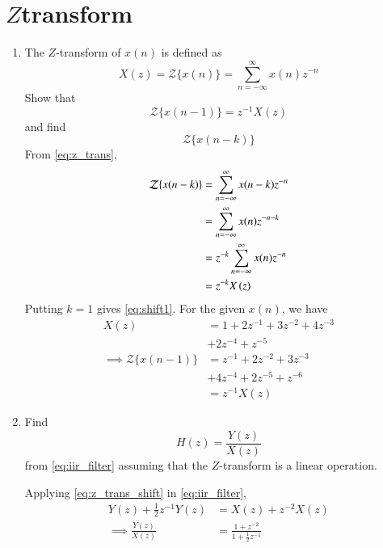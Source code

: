 \documentclass[journal,12pt,twocolumn]{IEEEtran}
\renewcommand\thesection{\arabic{section}}
\begin{document}
\section{\texorpdfstring{$Z$}-transform}
\begin{enumerate}[label=\thesection.\arabic*]
\item The $Z$-transform of $x(n)$ is defined as
\begin{equation}
\label{eq:z_trans}
X(z)={\mathcal {Z}}\{x(n)\}=\sum _{n=-\infty }^{\infty }x(n)z^{-n}
\end{equation}
Show that
\begin{equation}
\label{eq:shift1}
{\mathcal {Z}}\{x(n-1)\} = z^{-1}X(z)
\end{equation}
and find
\begin{equation}
	{\mathcal {Z}}\{x(n-k)\} 
\end{equation}
\solution From \eqref{eq:z_trans},
\begin{align}
{\mathcal {Z}}\{x(n-k)\} &=\sum _{n=-\infty }^{\infty }x(n-k)z^{-n}\\
&=\sum _{n=-\infty }^{\infty }x(n)z^{-n-k} \\
&= z^{-k}\sum _{n=-\infty }^{\infty }x(n)z^{-n} \\
&= z^{-k}X\left(z\right)
\label{eq:z_trans_shift}
\end{align}
Putting $k = 1$ gives \eqref{eq:shift1}. For the given $x(n)$, we have
\begin{align}
	X(z) &= 1 + 2z^{-1} + 3z^{-2} + 4z^{-3} \nonumber \\
		&+ 2z^{-4} + z^{-5} \\
	\implies {\mathcal {Z}}\{x(n-1)\} &= z^{-1} + 2z^{-2} + 3z^{-3} \nonumber \\
									  &+4z^{-4} + 2z^{-5} + z^{-6} \\
	&= z^{-1}X(z)
\end{align}	
\item Find
\begin{equation}
H(z) = \frac{Y(z)}{X(z)}
\end{equation}
from  \eqref{eq:iir_filter} assuming that the $Z$-transform is a linear operation.

\solution  Applying \eqref{eq:z_trans_shift} in \eqref{eq:iir_filter},
\begin{align}
Y(z) + \frac{1}{2}z^{-1}Y(z) &= X(z)+z^{-2}X(z) \\
\implies \frac{Y(z)}{X(z)} &= \frac{1 + z^{-2}}{1 + \frac{1}{2}z^{-1}}
\label{eq:freq_resp}
\end{align}


\end{enumerate}
\end{document}
